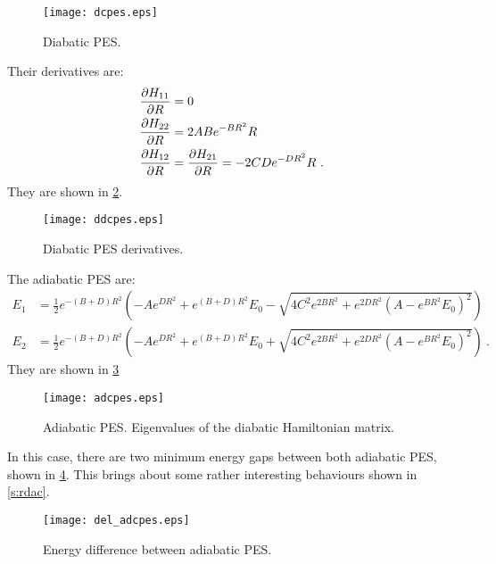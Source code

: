 \begin{figure}
\centering
\texttt{[image: dcpes.eps]}
\caption[Double avoided crossing: diabatic PES.]{Diabatic PES.}
\label{f:pesdc}
\end{figure}

Their derivatives are:
\begin{subequations}
\begin{align}
\frac{\partial H_{11}}{\partial R} &= 0\\
\frac{\partial H_{22}}{\partial R} &= 2 A B e^{-B R^{2}} R\\
\frac{\partial H_{12}}{\partial R} &= \frac{\partial H_{21}}{\partial R} = -2 C D e^{-D R^{2}} R~.
\end{align}
\end{subequations}
They are shown in \cref{f:dpesdc}.

\begin{figure}
\centering
\texttt{[image: ddcpes.eps]}
\caption[Double avoided crossing: diabatic PES derivatives.]{Diabatic PES derivatives.}
\label{f:dpesdc}
\end{figure}

The adiabatic PES are:
\begin{subequations}
\begin{align}
E_{1} &= \frac{1}{2} e^{-(B+D) R^{2}}
\left(
-A e^{D R^{2}} + e^{(B+D) R^{2}} E_{0} -
\sqrt{
4 C^{2} e^{2 B R^{2}} + e^{2 D R^{2}}\left( A - e^{B R^{2}} E_{0} \right)^{2}
}
\right)\\
E_{2} &= \frac{1}{2} e^{-(B+D) R^{2}}
\left(
-A e^{D R^{2}} + e^{(B+D) R^{2}} E_{0} +
\sqrt{
4 C^{2} e^{2 B R^{2}} + e^{2 D R^{2}}\left( A - e^{B R^{2}} E_{0} \right)^{2}
}
\right)~.
\end{align}
\end{subequations}
They are shown in \cref{f:apesdc}

\begin{figure}
\centering
\texttt{[image: adcpes.eps]}
\caption[Double avoided crossing: adiabatic PES.]{Adiabatic PES. Eigenvalues of the diabatic Hamiltonian matrix.}
\label{f:apesdc}
\end{figure}

In this case, there are two minimum energy gaps between both adiabatic PES, shown in \cref{f:delapesdc}. This brings about some rather interesting behaviours shown in \cref{s:rdac}.

\begin{figure}
\centering
\texttt{[image: del\_adcpes.eps]}
\caption[Double avoided crossing: energy difference between adiabatic PES.]{Energy difference between adiabatic PES.}
\label{f:delapesdc}
\end{figure}
%
